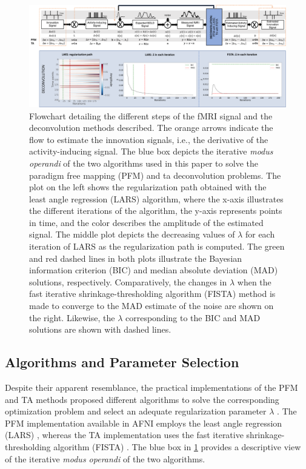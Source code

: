 \begin{figure}[t!]
    \begin{center}
        \includegraphics[width=\textwidth]{figures/synthesis_analysis/flowchart.pdf}
    \end{center}
    \caption{Flowchart detailing the different steps of the fMRI signal and the
    deconvolution methods described. The orange arrows indicate the flow to
    estimate the innovation signals, i.e., the derivative of the
    activity-inducing signal. The blue box depicts the iterative \textit{modus
    operandi} of the two algorithms used in this paper to solve the paradigm
    free mapping (PFM) and \acrfull*{ta} deconvolution problems. The plot on the
    left shows the regularization path obtained with the least angle regression
    (LARS) algorithm, where the x-axis illustrates the different iterations of
    the algorithm, the y-axis represents points in time, and the color describes
    the amplitude of the estimated signal. The middle plot depicts the
    decreasing values of $\lambda$ for each iteration of LARS as the
    regularization path is computed. The green and red dashed lines in both
    plots illustrate the Bayesian information criterion (BIC) and median
    absolute deviation (MAD) solutions, respectively. Comparatively, the changes
    in $\lambda$ when the fast iterative shrinkage-thresholding algorithm
    (FISTA) method is made to converge to the MAD estimate of the noise are
    shown on the right. Likewise, the $\lambda$ corresponding to the BIC and MAD
    solutions are shown with dashed lines.}
\label{fig:flowchart}
\end{figure}

\subsection{Algorithms and Parameter Selection}
\label{sec:regparam}
Despite their apparent resemblance, the practical implementations of the PFM and
TA methods proposed different algorithms to solve the corresponding optimization
problem and select an adequate regularization parameter $\lambda$
\citep{Gaudes2013Paradigmfreemapping,Karahanoglu2013TotalactivationfMRI}. The
PFM implementation available in AFNI employs the least angle regression (LARS)
\citep{Efron2004Leastangleregression}, whereas the TA implementation uses the
fast iterative shrinkage-thresholding algorithm (FISTA)
\citep{Beck2009FastIterativeShrinkage}. The blue box in \cref{fig:flowchart}
provides a descriptive view of the iterative \textit{modus operandi} of the two
algorithms.

